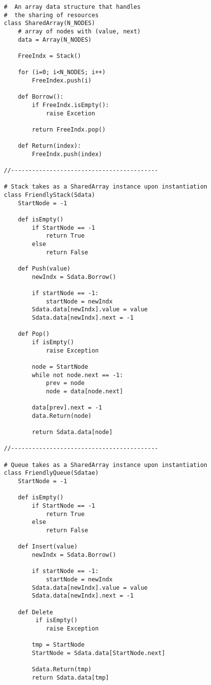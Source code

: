 \documentclass[a4paper,11pt]{article}
\begin{document}
\begin{verbatim}
#  An array data structure that handles
#  the sharing of resources
class SharedArray(N_NODES)
    # array of nodes with (value, next)
    data = Array(N_NODES)
    
    FreeIndx = Stack()
    
    for (i=0; i<N_NODES; i++)
        FreeIndex.push(i)

    def Borrow():
        if FreeIndx.isEmpty():
            raise Excetion
            
        return FreeIndx.pop()

    def Return(index):
        FreeIndx.push(index)

//------------------------------------------

# Stack takes as a SharedArray instance upon instantiation
class FriendlyStack(Sdata)
    StartNode = -1

    def isEmpty()
        if StartNode == -1
            return True
        else
            return False

    def Push(value)
        newIndx = Sdata.Borrow()
        
        if startNode == -1:
            startNode = newIndx
        Sdata.data[newIndx].value = value
        Sdata.data[newIndx].next = -1
        
    def Pop()
        if isEmpty()
            raise Exception
        
        node = StartNode
        while not node.next == -1:
            prev = node
            node = data[node.next]
              
        data[prev].next = -1
        data.Return(node)
          
        return Sdata.data[node]

//------------------------------------------

# Queue takes as a SharedArray instance upon instantiation
class FriendlyQueue(Sdatae)
    StartNode = -1

    def isEmpty()
        if StartNode == -1
            return True
        else
            return False

    def Insert(value)
        newIndx = Sdata.Borrow()
        
        if startNode == -1:
            startNode = newIndx    
        Sdata.data[newIndx].value = value
        Sdata.data[newIndx].next = -1
    
    def Delete
         if isEmpty()
            raise Exception
            
        tmp = StartNode
        StartNode = Sdata.data[StartNode.next]
        
        Sdata.Return(tmp)
        return Sdata.data[tmp]       
        
\end{verbatim}

\end{document}
